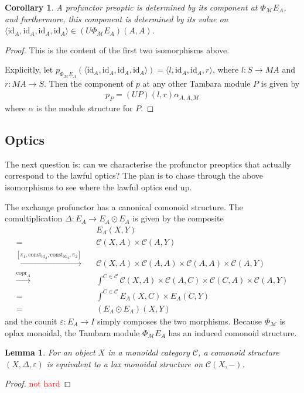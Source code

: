 \documentclass[11pt,a4paper]{article}
\theoremstyle{plain}
\newtheorem{lemma}[theorem]{Lemma}
\newtheorem{corollary}[theorem]{Corollary}
\theoremstyle{definition}
\newcommand{\C}{\mathscr{C}}
\newcommand{\M}{\mathscr{M}}
\newcommand{\Pastro}{\Phi}
\newcommand{\id}{\mathrm{id}}
\newcommand{\const}{\mathrm{const}}
\DeclareMathOperator{\copr}{copr}
\newcommand{\todo}[1]{\textcolor{red}{\small #1}}
\begin{document}
\begin{corollary}
A profunctor preoptic is determined by its component at $\Pastro_\M E_A$, and furthermore, this component is determined by its value on $\langle \id_A, \id_A, \id_A, \id_A \rangle \in (U \Pastro_\M E_A)(A, A)$.
\end{corollary}
\begin{proof}
This is the content of the first two isomorphisms above.

Explicitly, let $p_{\Pastro_\M E_A}(\langle \id_A, \id_A, \id_A, \id_A \rangle) = \langle l, \id_A, \id_A, r \rangle$, where $l : S \to M A$ and $r : M A \to S$. Then the component of $p$ at any other Tambara module $P$ is given by
\begin{align*}
p_P = (UP)(l,r) \alpha_{A,A,M}
\end{align*}
where $\alpha$ is the module structure for $P$.
\end{proof}



\subsection{Optics}

The next question is: can we characterise the profunctor preoptics that actually correspond to the lawful optics? The plan is to chase through the above isomorphisms to see where the lawful optics end up.

The exchange profunctor has a canonical comonoid structure. The comultiplication $\Delta : E_A \to E_A \odot E_A$ is given by the composite
\begin{align*}
&E_A(X,Y) \\
= \quad& \C(X, A) \times \C(A, Y) \\
\xrightarrow{[\pi_1, \const_{\id_A}, \const_{\id_A}, \pi_2]} \quad& \C(X, A) \times \C(A, A) \times \C(A, A) \times \C(A, Y) \\
\xrightarrow{\copr_A} \quad& \int^{C \in \C} \C(X, A) \times \C(A, C) \times \C(C, A) \times \C(A, Y) \\
= \quad& \int^{C \in \C} E_A(X,C) \times E_A(C,Y) \\
= \quad&  (E_A \odot E_A)(X,Y)
\end{align*}
and the counit $\varepsilon : E_A \to I$ simply composes the two morphisms. Because $\Pastro_\M$ is oplax monoidal, the Tambara module $\Pastro_\M E_A$ has an induced comonoid structure.

\begin{lemma}
For an object $X$ in a monoidal category $\C$, a comonoid structure $(X,\Delta,\varepsilon)$ is equivalent to a lax monoidal structure on $\C(X, -)$.
\end{lemma}
\begin{proof}
\todo{not hard}
\end{proof}
\end{document}
